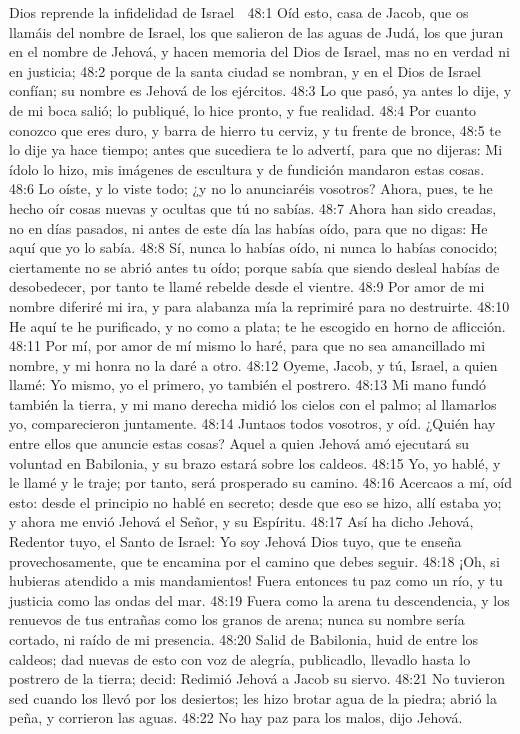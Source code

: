 Dios reprende la infidelidad de Israel  

48:1 Oíd esto, casa de Jacob, que os llamáis del nombre de Israel, los que salieron de las aguas de Judá, los que juran en el nombre de Jehová, y hacen memoria del Dios de Israel, mas no en verdad ni en justicia;  
48:2 porque de la santa ciudad se nombran, y en el Dios de Israel confían; su nombre es Jehová de los ejércitos.  
48:3 Lo que pasó, ya antes lo dije, y de mi boca salió; lo publiqué, lo hice pronto, y fue realidad.  
48:4 Por cuanto conozco que eres duro, y barra de hierro tu cerviz, y tu frente de bronce,  
48:5 te lo dije ya hace tiempo; antes que sucediera te lo advertí, para que no dijeras: Mi ídolo lo hizo, mis imágenes de escultura y de fundición mandaron estas cosas.  
48:6 Lo oíste, y lo viste todo; ¿y no lo anunciaréis vosotros? Ahora, pues, te he hecho oír cosas nuevas y ocultas que tú no sabías.  
48:7 Ahora han sido creadas, no en días pasados, ni antes de este día las habías oído, para que no digas: He aquí que yo lo sabía.  
48:8 Sí, nunca lo habías oído, ni nunca lo habías conocido; ciertamente no se abrió antes tu oído; porque sabía que siendo desleal habías de desobedecer, por tanto te llamé rebelde desde el vientre.  
48:9 Por amor de mi nombre diferiré mi ira, y para alabanza mía la reprimiré para no destruirte.  
48:10 He aquí te he purificado, y no como a plata; te he escogido en horno de aflicción.  
48:11 Por mí, por amor de mí mismo lo haré, para que no sea amancillado mi nombre, y mi honra no la daré a otro. 
48:12 Oyeme, Jacob, y tú, Israel, a quien llamé: Yo mismo, yo el primero, yo también el postrero. 
48:13 Mi mano fundó también la tierra, y mi mano derecha midió los cielos con el palmo; al llamarlos yo, comparecieron juntamente.  
48:14 Juntaos todos vosotros, y oíd. ¿Quién hay entre ellos que anuncie estas cosas? Aquel a quien Jehová amó ejecutará su voluntad en Babilonia, y su brazo estará sobre los caldeos.  
48:15 Yo, yo hablé, y le llamé y le traje; por tanto, será prosperado su camino.  
48:16 Acercaos a mí, oíd esto: desde el principio no hablé en secreto; desde que eso se hizo, allí estaba yo; y ahora me envió Jehová el Señor, y su Espíritu.  
48:17 Así ha dicho Jehová, Redentor tuyo, el Santo de Israel: Yo soy Jehová Dios tuyo, que te enseña provechosamente, que te encamina por el camino que debes seguir.  
48:18 ¡Oh, si hubieras atendido a mis mandamientos! Fuera entonces tu paz como un río, y tu justicia como las ondas del mar.  
48:19 Fuera como la arena tu descendencia, y los renuevos de tus entrañas como los granos de arena; nunca su nombre sería cortado, ni raído de mi presencia.  
48:20 Salid de Babilonia, huid de entre los caldeos; dad nuevas de esto con voz de alegría, publicadlo, llevadlo hasta lo postrero de la tierra; decid: Redimió Jehová a Jacob su siervo.  
48:21 No tuvieron sed cuando los llevó por los desiertos; les hizo brotar agua de la piedra; abrió la peña, y corrieron las aguas.  
48:22 No hay paz para los malos, dijo Jehová. 

